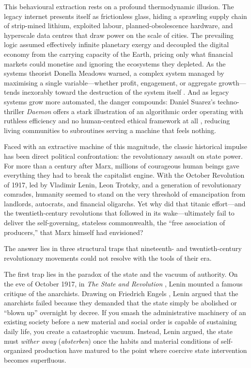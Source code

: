 This behavioural extraction rests on a profound thermodynamic illusion. The legacy internet presents itself as frictionless glass, hiding a sprawling supply chain of strip-mined lithium, exploited labour, planned-obsolescence hardware, and hyperscale data centres that draw power on the scale of cities. The prevailing logic assumed effectively infinite planetary exergy and decoupled the digital economy from the carrying capacity of the Earth, pricing only what financial markets could monetise and ignoring the ecosystems they depleted. As the systems theorist Donella Meadows warned, a complex system managed by maximising a single variable---whether profit, engagement, or aggregate growth---tends inexorably toward the destruction of the system itself \parencite{meadows2008}. And as legacy systems grow more automated, the danger compounds: Daniel Suarez's techno-thriller \textit{Daemon} offers a stark illustration of an algorithmic order operating with ruthless efficiency and no human-centred ethical framework at all \parencite{suarez2006}, reducing living communities to subroutines serving a machine that feels nothing.

Faced with an extractive machine of this magnitude, the classic historical impulse has been direct political confrontation: the revolutionary assault on state power. For more than a century after Marx, millions of courageous human beings gave everything they had to break the capitalist engine. With the October Revolution of 1917, led by Vladimir Lenin, Leon Trotsky, and a generation of revolutionary comrades, humanity seemed to stand on the very threshold of emancipation from landlords, autocrats, and financial oligarchs. Yet why did that titanic effort---and the twentieth-century revolutions that followed in its wake---ultimately fail to deliver the self-governing, stateless commonwealth, the ``free association of producers,'' that Marx himself had envisioned?

The answer lies in three structural traps that nineteenth- and twentieth-century revolutionary movements could not resolve with the tools of their era.

The first trap lies in the paradox of the state and the vacuum of authority. On the eve of October 1917, in \textit{The State and Revolution} \parencite{lenin1917state}, Lenin mounted a famous critique of the anarchists. Drawing on Friedrich Engels \parencite{engels1878}, Lenin argued that the anarchists failed because they demanded that the state simply be abolished or ``blown up'' overnight by decree. If you smash the administrative machinery of an existing society before a new material and social order is capable of sustaining daily life, you create a catastrophic vacuum. Instead, Lenin argued, the state must \textit{wither away} (\textit{absterben}) once the habits and material conditions of self-organized production have matured to the point where coercive state intervention becomes superfluous.

